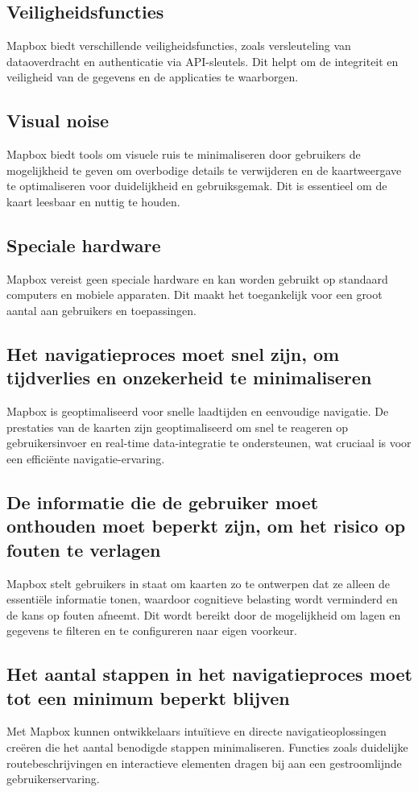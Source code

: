 \subsection*{Veiligheidsfuncties}
Mapbox biedt verschillende veiligheidsfuncties, zoals versleuteling van dataoverdracht en authenticatie via API-sleutels. Dit helpt om de integriteit en veiligheid van de gegevens en de applicaties te waarborgen.

\subsection*{Visual noise}
Mapbox biedt tools om visuele ruis te minimaliseren door gebruikers de mogelijkheid te geven om overbodige details te verwijderen en de kaartweergave te optimaliseren voor duidelijkheid en gebruiksgemak. Dit is essentieel om de kaart leesbaar en nuttig te houden.

\subsection*{Speciale hardware}
Mapbox vereist geen speciale hardware en kan worden gebruikt op standaard computers en mobiele apparaten. Dit maakt het toegankelijk voor een groot aantal aan gebruikers en toepassingen.

\subsection*{Het navigatieproces moet snel zijn, om tijdverlies en onzekerheid te minimaliseren}
Mapbox is geoptimaliseerd voor snelle laadtijden en eenvoudige navigatie. De prestaties van de kaarten zijn geoptimaliseerd om snel te reageren op gebruikersinvoer en real-time data-integratie te ondersteunen, wat cruciaal is voor een efficiënte navigatie-ervaring.

\subsection*{De informatie die de gebruiker moet onthouden moet beperkt zijn, om het risico op fouten te verlagen}
Mapbox stelt gebruikers in staat om kaarten zo te ontwerpen dat ze alleen de essentiële informatie tonen, waardoor cognitieve belasting wordt verminderd en de kans op fouten afneemt. Dit wordt bereikt door de mogelijkheid om lagen en gegevens te filteren en te configureren naar eigen voorkeur.

\subsection*{Het aantal stappen in het navigatieproces moet tot een minimum beperkt blijven}
Met Mapbox kunnen ontwikkelaars intuïtieve en directe navigatieoplossingen creëren die het aantal benodigde stappen minimaliseren. Functies zoals duidelijke routebeschrijvingen en interactieve elementen dragen bij aan een gestroomlijnde gebruikerservaring.


